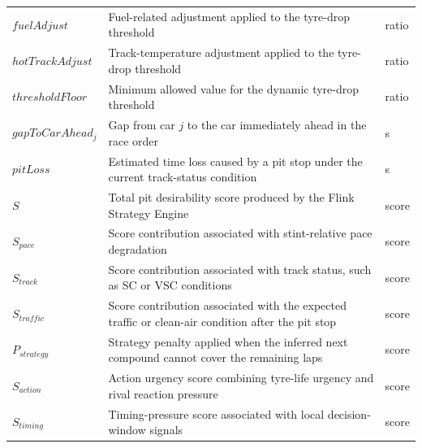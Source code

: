 \documentclass{Configuration_Files/PoliMi3i_thesis}
\begin{document}
\begin{longtable}{p{}p{}p{}}
    $fuelAdjust$       & Fuel-related adjustment applied to the tyre-drop threshold                                            & ratio         \\

    $hotTrackAdjust$   & Track-temperature adjustment applied to the tyre-drop threshold                                       & ratio         \\

    $thresholdFloor$   & Minimum allowed value for the dynamic tyre-drop threshold                                             & ratio         \\

    $gapToCarAhead_j$  & Gap from car $j$ to the car immediately ahead in the race order                                       & s             \\

    $pitLoss$          & Estimated time loss caused by a pit stop under the current track-status condition                     & s             \\

    $S$                & Total pit desirability score produced by the Flink Strategy Engine                                    & score         \\

    $S_{pace}$         & Score contribution associated with stint-relative pace degradation                                    & score         \\

    $S_{track}$        & Score contribution associated with track status, such as SC or VSC conditions                         & score         \\

    $S_{traffic}$      & Score contribution associated with the expected traffic or clean-air condition after the pit stop     & score         \\

    $P_{strategy}$     & Strategy penalty applied when the inferred next compound cannot cover the remaining laps              & score         \\

    $S_{action}$       & Action urgency score combining tyre-life urgency and rival reaction pressure                          & score         \\

    $S_{timing}$       & Timing-pressure score associated with local decision-window signals                                   & score         \\


\end{longtable}
\end{document}
